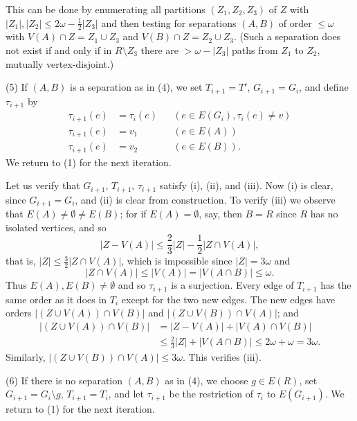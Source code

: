 This can be done by enumerating all partitions $(Z_1, Z_2, Z_3)$ of $Z$ with $|Z_1|, |Z_2| \le 2\omega - \frac{1}{2}|Z_3|$ and then testing for separations $(A, B)$ of order $\le \omega$ with $V(A) \cap Z = Z_1 \cup Z_3$ and $V(B) \cap Z = Z_2 \cup Z_3$. (Such a separation does not exist if and only if in $R \setminus Z_3$ there are $> \omega - |Z_3|$ paths from $Z_1$ to $Z_2$, mutually vertex-disjoint.)

\hspace*{12pt}(5) If $(A, B)$ is a separation as in (4), we set $T_{i+1} = T'$, $G_{i+1} = G_i$, and define $\tau_{i+1}$ by
\begin{align*}
\tau_{i+1}(e) &= \tau_i(e) && (e \in E(G_i), \tau_i(e) \ne v) \\
\tau_{i+1}(e) &= v_1 && (e \in E(A)) \\
\tau_{i+1}(e) &= v_2 && (e \in E(B)).
\end{align*}
We return to (1) for the next iteration.

Let us verify that $G_{i+1}$, $T_{i+1}$, $\tau_{i+1}$ satisfy (i), (ii), and (iii). Now (i) is clear, since $G_{i+1} = G_i$, and (ii) is clear from construction. To verify (iii) we observe that $E(A) \ne \emptyset \ne E(B)$; for if $E(A) = \emptyset$, say, then $B = R$ since $R$ has no isolated vertices, and so
\begin{equation*}
|Z - V(A)| \le \frac{2}{3}|Z| - \frac{1}{2}|Z \cap V(A)|,
\end{equation*}
that is, $|Z| \le \frac{3}{2}|Z \cap V(A)|$, which is impossible since $|Z| = 3\omega$ and
\begin{equation*}
|Z \cap V(A)| \le |V(A)| = |V(A \cap B)| \le \omega.
\end{equation*}
Thus $E(A), E(B) \ne \emptyset$ and so $\tau_{i+1}$ is a surjection. Every edge of $T_{i+1}$ has the same order as it does in $T_i$ except for the two new edges. The new edges have orders $|(Z \cup V(A)) \cap V(B)|$ and $|(Z \cup V(B)) \cap V(A)|$; and
\begin{align*}
|(Z \cup V(A)) \cap V(B)| &= |Z - V(A)| + |V(A) \cap V(B)| \\
&\le \frac{2}{3}|Z| + |V(A \cap B)| \le 2\omega + \omega = 3\omega.
\end{align*}
Similarly, $|(Z \cup V(B)) \cap V(A)| \le 3\omega$. This verifies (iii).

\hspace*{12pt}(6) If there is no separation $(A, B)$ as in (4), we choose $g \in E(R)$, set $G_{i+1} = G_i \setminus g$, $T_{i+1} = T_i$, and let $\tau_{i+1}$ be the restriction of $\tau_i$ to $E(G_{i+1})$. We return to (1) for the next iteration.

